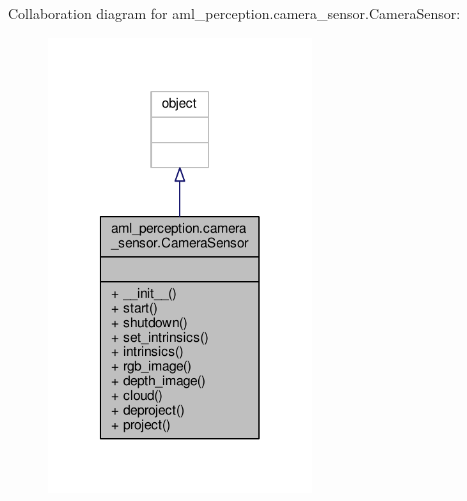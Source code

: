 Collaboration diagram for aml\-\_\-perception.\-camera\-\_\-sensor.\-Camera\-Sensor\-:
\nopagebreak
\begin{figure}[H]
\begin{center}
\leavevmode
\includegraphics[width=198pt]{classaml__perception_1_1camera__sensor_1_1_camera_sensor__coll__graph}
\end{center}
\end{figure}
